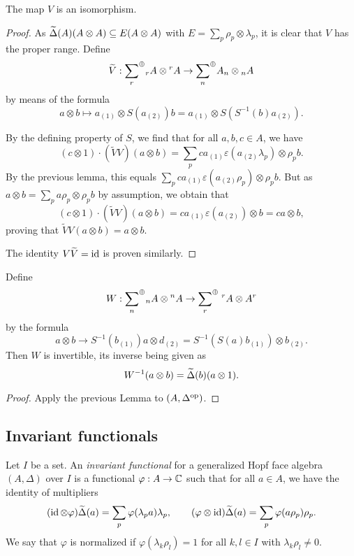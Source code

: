 \begin{Lem}\label{LemUni} The map $V$ is an isomorphism.
\end{Lem}
\begin{proof} As $\widetilde{\Delta}(A)(A\otimes A)\subseteq E(A\otimes A)$ with
  $E = \sum_p \rho_p\otimes \lambda_p$, it is clear that $V$ has the
  proper range. Define \[\widetilde{V}: \underset{r}{\sum}^{\oplus} {}_rA\otimes
  {}^rA\rightarrow\underset{n}{\sum}^{\oplus} A_n\otimes {}_{n}A\] by means of the
  formula \[a\otimes b \mapsto a_{(1)}\otimes S(a_{(2)})b =
  a_{(1)}\otimes S(S^{-1}(b)a_{(2)}).\]

  By the defining property of $S$, we find that for all $a,b,c\in A$,
  we have \[(c\otimes 1)\cdot (\widetilde{V}V)(a\otimes b) = \sum_p
  ca_{(1)}\varepsilon(a_{(2)}\lambda_p)\otimes \rho_pb.\] By the
  previous lemma, this equals $\sum_p
  ca_{(1)}\varepsilon(a_{(2)}\rho_p)\otimes \rho_pb$. But as $a\otimes
  b = \sum_p a\rho_p\otimes \rho_pb$ by assumption, we obtain
  that \[(c\otimes 1)\cdot (\widetilde{V}V)(a\otimes b) =
  ca_{(1)}\varepsilon(a_{(2)})\otimes b = ca\otimes b,\] proving that
  $\widetilde{V}V(a\otimes b) = a\otimes b$.

  The identity $V\widetilde{V} = \operatorname{id}$ is proven similarly.
\end{proof}

\begin{Cor} Define \[W: \underset{n}{\sum}^{\oplus} {}_n A \otimes {}^nA \rightarrow
  \underset{r}{\sum}^{\oplus} \; {}^rA\otimes A^r\] by the formula \[a\otimes b
  \rightarrow S^{-1}(b_{(1)})a\otimes d_{(2)} =
  S^{-1}(S(a)b_{(1)})\otimes b_{(2)}.\] Then $W$ is invertible, its
  inverse being given as \[W^{-1}(a\otimes b) = \widetilde{\Delta}(b)(a\otimes
  1).\]
\end{Cor}

\begin{proof} Apply the previous Lemma to $(A,\Delta^{\operatorname{\mathrm{op}}})$.
\end{proof}

\subsection{Invariant functionals}

\begin{Def} Let $I$ be a set. An \emph{invariant functional} for a
  generalized Hopf face algebra $(A,\Delta)$ over $I$ is a functional
  $\varphi:A \rightarrow \mathbb{C}$ such that for all $a\in A$, we have the
  identity of multipliers \[(\operatorname{id}\otimes \varphi)\widetilde{\Delta}(a) = \sum_p
  \varphi(\lambda_p a)\lambda_p,\qquad (\varphi\otimes \operatorname{id})\widetilde{\Delta}(a)
  = \sum_p\varphi(a\rho_p)\rho_p.\] We say that $\varphi$ is
  normalized if $\varphi(\lambda_k\rho_l)=1$ for all $k,l\in I$ with
  $\lambda_k\rho_l\neq 0$.
\end{Def}

